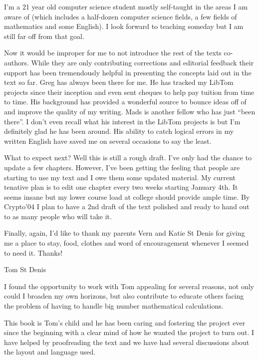 \documentclass[b5paper]{book}
\begin{document}
I'm a 21 year old computer science student mostly self-taught in the areas I am aware of (which includes a half-dozen
computer science fields, a few fields of mathematics and some English).  I look forward to teaching someday but I am
still far off from that goal.  

Now it would be improper for me to not introduce the rest of the texts co-authors.  While they are only contributing 
corrections and editorial feedback their support has been tremendously helpful in presenting the concepts laid out
in the text so far.  Greg has always been there for me.  He has tracked my LibTom projects since their inception and even
sent cheques to help pay tuition from time to time.  His background has provided a wonderful source to bounce ideas off
of and improve the quality of my writing.  Mads is another fellow who has just ``been there''.  I don't even recall what
his interest in the LibTom projects is but I'm definitely glad he has been around.  His ability to catch logical errors
in my written English have saved me on several occasions to say the least.

What to expect next?  Well this is still a rough draft.  I've only had the chance to update a few chapters.  However, I've
been getting the feeling that people are starting to use my text and I owe them some updated material.  My current tenative
plan is to edit one chapter every two weeks starting January 4th.  It seems insane but my lower course load at college
should provide ample time.  By Crypto'04 I plan to have a 2nd draft of the text polished and ready to hand out to as many
people who will take it.

Finally, again, I'd like to thank my parents Vern and Katie St Denis for giving me a place to stay, food, clothes and 
word of encouragement whenever I seemed to need it.  Thanks!

\begin{flushright} Tom St Denis \end{flushright}

\newpage
I found the opportunity to work with Tom appealing for several reasons, not only could I broaden my own horizons, but also 
contribute to educate others facing the problem of having to handle big number mathematical calculations.

This book is Tom's child and he has been caring and fostering the project ever since the beginning with a clear mind of 
how he wanted the project to turn out. I have helped by proofreading the text and we have had several discussions about 
the layout and language used.
\end{document}
